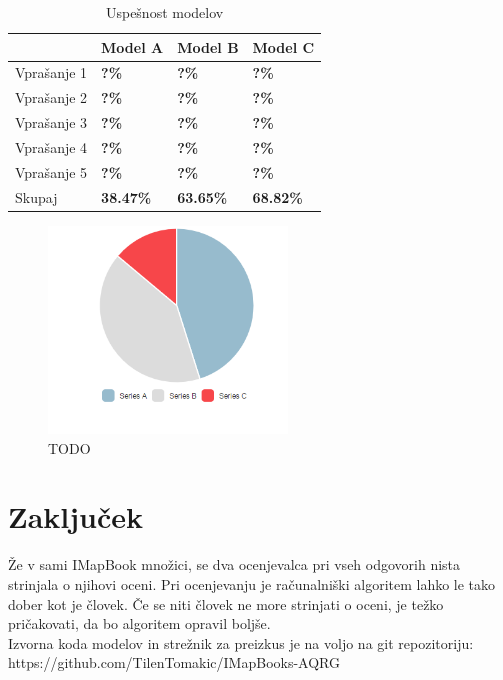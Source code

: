 \documentclass[journal]{IEEEtran}
\begin{document}
\begin{table}[]
	\begin{tabular}{l|l|l|l|}
		\cline{2-4}
		                            & Model A          & Model B          & Model C          \\ \hline
		\multicolumn{1}{|l|}{Vprašanje 1} & \textbf{?\%} & \textbf{?\%} & \textbf{?\%} \\ \hline
		\multicolumn{1}{|l|}{Vprašanje 2} & \textbf{?\%} & \textbf{?\%} & \textbf{?\%} \\ \hline
		\multicolumn{1}{|l|}{Vprašanje 3} & \textbf{?\%} & \textbf{?\%} & \textbf{?\%} \\ \hline
		\multicolumn{1}{|l|}{Vprašanje 4} & \textbf{?\%} & \textbf{?\%} & \textbf{?\%} \\ \hline
		\multicolumn{1}{|l|}{Vprašanje 5} & \textbf{?\%} & \textbf{?\%} & \textbf{?\%} \\ \hline
		\multicolumn{1}{|l|}{Skupaj} & \textbf{38.47\%} & \textbf{63.65\%} & \textbf{68.82\%} \\ \hline
	\end{tabular}
	\caption{Uspešnost modelov}
	\label{t:mod}
\end{table}

\begin{figure}[!t]
	\centering
	\includegraphics[width=2.5in]{chart}
	\caption{TODO}
	\label{sl:ma}
\end{figure}


\section{Zaključek}
Že v sami IMapBook množici, se dva ocenjevalca pri vseh odgovorih nista strinjala o njihovi oceni. Pri ocenjevanju je računalniški algoritem lahko le tako dober kot je človek. Če se niti človek ne more strinjati o oceni, je težko pričakovati, da bo algoritem opravil boljše.\\

Izvorna koda modelov in strežnik za preizkus je na voljo na git repozitoriju: https://github.com/TilenTomakic/IMapBooks-AQRG

\ifCLASSOPTIONcaptionsoff
  \newpage
\fi



\end{document}
